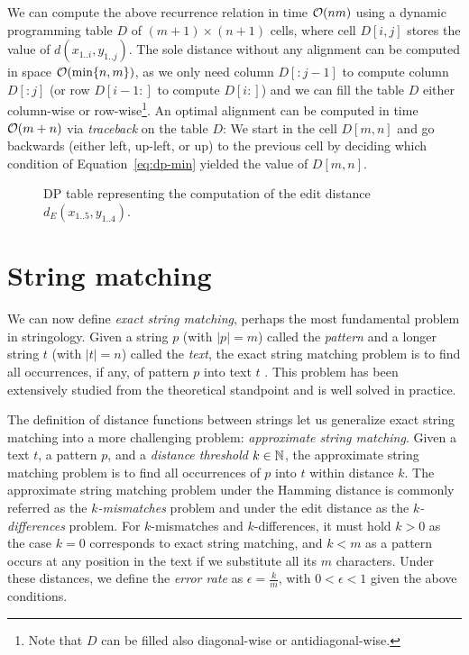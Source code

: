We can compute the above recurrence relation in time $\mathcal{O}(nm)$ using a dynamic programming table $D$ of $(m+1) \times (n+1)$ cells, where cell $D[i,j]$ stores the value of $d(x_{1..i},y_{1..j})$.
The sole distance without any alignment can be computed in space $\mathcal{O}(\text{min}\{ n, m \})$, as we only need column $D[:j-1]$ to compute column $D[:j]$ (or row $D[i-1:]$ to compute $D[i:]$) and we can fill the table $D$ either column-wise or row-wise\footnote{Note that $D$ can be filled also diagonal-wise or antidiagonal-wise.}.
An optimal alignment can be computed in time $\mathcal{O}(m + n)$ via \emph{traceback} on the table $D$:
We start in the cell $D[m,n]$ and go backwards (either left, up-left, or up) to the previous cell by deciding which condition of Equation~\ref{eq:dp-min} yielded the value of $D[m,n]$.

\begin{figure}[h]
\begin{center}
\caption[Example of DP table.]{DP table representing the computation of the edit distance $d_E(x_{1..5}, y_{1..4})$.}
\label{fig:edit-dp}

\end{center}
\end{figure}



\section{String matching}


We can now define \emph{exact string matching}, perhaps the most fundamental problem in stringology.
Given a string $p$ (with $|p|=m$) called the \emph{pattern} and a longer string $t$ (with $|t|=n$) called the \emph{text}, the exact string matching problem is to find all occurrences, if any, of pattern $p$ into text $t$ \citep{Gusfield1997}.
This problem has been extensively studied from the theoretical standpoint and is well solved in practice.

The definition of distance functions between strings let us generalize exact string matching into a more challenging problem: \emph{approximate string matching}.
Given a text $t$, a pattern $p$, and a \emph{distance threshold} $k \in \mathbb {N}$, the approximate string matching problem is to find all occurrences of $p$ into $t$ within distance $k$.
The approximate string matching problem under the Hamming distance is commonly referred as the \emph{$k$-mismatches} problem and under the edit distance as the \emph{$k$-differences} problem.
For $k$-mismatches and $k$-differences, it must hold $k > 0$ as the case $k = 0$ corresponds to exact string matching, and $k < m$ as a pattern occurs at any position in the text if we substitute all its $m$ characters.
Under these distances, we define the \emph{error rate} as $\epsilon = \frac{k}{m}$, with $0 < \epsilon < 1$ given the above conditions.%

